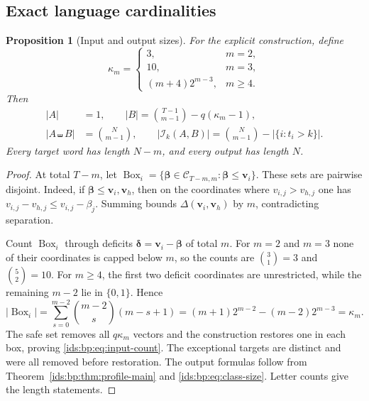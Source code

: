 \documentclass[11pt,letterpaper]{article}
\newtheorem{proposition}[theorem]{Proposition}
\theoremstyle{definition}\newtheorem{definition}[theorem]{Definition}
\theoremstyle{remark}\newtheorem{remark}[theorem]{Remark}
\theoremstyle{definition}\newtheorem{question}[theorem]{Question}
\newcommand{\sh}{\mathbin{\shuffle}}
\newcommand{\ins}[3]{\mathcal I_{#1}(#2,#3)}
\newcommand{\bpC}[2]{\mathcal C_{#1,#2}}
\begin{document}
\subsection{Exact language cardinalities}
\begin{proposition}[Input and output sizes]
\label{ids:bp:prop:sizes}
For the explicit construction, define
\begin{equation}
 \kappa_m=
 \begin{cases}
 3,&m=2,\\
 10,&m=3,\\
 (m+4)2^{m-3},&m\geq4.
 \end{cases}
 \label{ids:bp:eq:K}
\end{equation}
Then
\begin{align}
 |A|&=1,\qquad |B|=\binom{T-1}{m-1}-q(\kappa_m-1),
                         \label{ids:bp:eq:input-count}\\
 |A\sh B|&=\binom{N}{m-1},\qquad
 |\ins{k}{A}{B}|=\binom{N}{m-1}-|\{i:t_i>k\}|.
                         \label{ids:bp:eq:output-count}
\end{align}
Every target word has length $N-m$, and every output has length $N$.
\end{proposition}
\begin{proof}
At total $T-m$, let
$\operatorname{Box}_i=\{\boldsymbol\beta\in\bpC{T-m}{m}:
\boldsymbol\beta\leq\mathbf v_i\}$. These sets are pairwise disjoint.
Indeed, if $\boldsymbol\beta\leq\mathbf v_i,\mathbf v_h$, then on the
coordinates where $v_{i,j}>v_{h,j}$ one has
$v_{i,j}-v_{h,j}\leq v_{i,j}-\beta_j$. Summing bounds
$\Delta(\mathbf v_i,\mathbf v_h)$ by $m$, contradicting separation.

Count $\operatorname{Box}_i$ through deficits $\boldsymbol\delta=\mathbf v_i-
\boldsymbol\beta$ of total $m$. For $m=2$ and $m=3$ none of their coordinates
is capped below $m$, so the counts are $\binom31=3$ and $\binom52=10$.
For $m\geq4$, the first two deficit coordinates are unrestricted, while the
remaining $m-2$ lie in $\{0,1\}$. Hence
\[
 |\operatorname{Box}_i|=\sum_{s=0}^{m-2}\binom{m-2}{s}(m-s+1)
 =(m+1)2^{m-2}-(m-2)2^{m-3}=\kappa_m.
\]
The safe set removes all $q\kappa_m$ vectors and the construction restores
one in each box, proving \eqref{ids:bp:eq:input-count}. The exceptional
targets are distinct and were all removed before restoration. The output
formulas follow from Theorem~\ref{ids:bp:thm:profile-main} and
\eqref{ids:bp:eq:class-size}. Letter counts give the length statements.
\end{proof}
\end{document}
